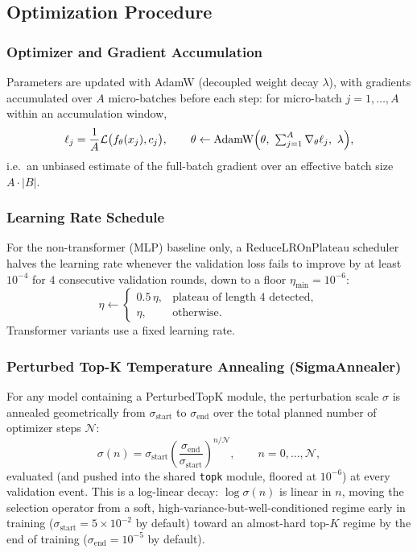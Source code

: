 \documentclass[stu,floatsintext]{apa7}
\begin{document}
\subsection{Optimization Procedure}

\subsubsection{Optimizer and Gradient Accumulation}
Parameters are updated with AdamW (decoupled weight decay $\lambda$), with gradients accumulated over
$A$ micro-batches before each step: for micro-batch $j=1,\dots,A$ within an
accumulation window,
\begin{equation}
  \ell_j = \frac{1}{A}\mathcal L\bigl(f_\theta(x_j), c_j\bigr), \qquad
  \theta \leftarrow \operatorname{AdamW}\Bigl(\theta,\ \textstyle\sum_{j=1}^{A}\nabla_\theta \ell_j,\ \lambda\Bigr),
\end{equation}
i.e.\ an unbiased estimate of the full-batch gradient over an effective batch size $A\cdot|B|$.

\subsubsection{Learning Rate Schedule}
For the non-transformer (MLP) baseline only, a ReduceLROnPlateau scheduler halves the learning
rate whenever the validation loss fails to improve by at least $10^{-4}$ for $4$ consecutive validation
rounds, down to a floor $\eta_{\min}=10^{-6}$:
\begin{equation}
  \eta \leftarrow \begin{cases} 0.5\,\eta, & \text{plateau of length } 4 \text{ detected}, \\ \eta, & \text{otherwise}. \end{cases}
\end{equation}
Transformer variants use a fixed learning rate.

\subsubsection{Perturbed Top-K Temperature Annealing (SigmaAnnealer)}
For any model containing a PerturbedTopK module, the perturbation scale $\sigma$ is annealed geometrically from $\sigma_{\mathrm{start}}$ to $\sigma_{\mathrm{end}}$ over the total
planned number of optimizer steps $\mathcal N$:
\begin{equation}
  \sigma(n) = \sigma_{\mathrm{start}}\left(\frac{\sigma_{\mathrm{end}}}{\sigma_{\mathrm{start}}}\right)^{n/\mathcal N},
  \qquad n=0,\dots,\mathcal N,
\end{equation}
evaluated (and pushed into the shared \texttt{topk} module, floored at $10^{-6}$) at every validation
event. This is a log-linear decay: $\log\sigma(n)$ is linear in $n$, moving the selection operator from a
soft, high-variance-but-well-conditioned regime early in training ($\sigma_{\mathrm{start}}=5\times10^{-2}$
by default) toward an almost-hard top-$K$ regime by the end of training ($\sigma_{\mathrm{end}}=10^{-5}$ by
default).
\end{document}
